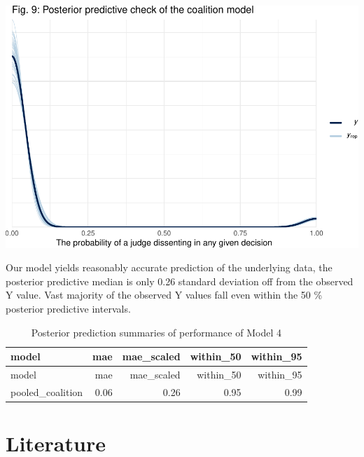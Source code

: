 \documentclass[
  11pt,
]{article}
\begin{document}
\vspace{25pt}

\includegraphics{dissents_article_appendix_files/figure-latex/pp_check_coalition-1.pdf}
\vspace{25pt}

Our model yields reasonably accurate prediction of the underlying data,
the posterior predictive median is only 0.26 standard deviation off from
the observed Y value. Vast majority of the observed Y values fall even
within the 50 \% posterior predictive intervals.

\begin{longtable}[]{@{}lrrrr@{}}
\caption{Posterior prediction summaries of performance of Model
4}\tabularnewline
\toprule\noalign{}
model & mae & mae\_scaled & within\_50 & within\_95 \\
\midrule\noalign{}
\endfirsthead
\toprule\noalign{}
model & mae & mae\_scaled & within\_50 & within\_95 \\
\midrule\noalign{}
\endhead
\bottomrule\noalign{}
\endlastfoot
pooled\_coalition & 0.06 & 0.26 & 0.95 & 0.99 \\
\end{longtable}

\vspace{25pt}

\hypertarget{literature}{%
\section*{Literature}\label{literature}}
\end{document}
